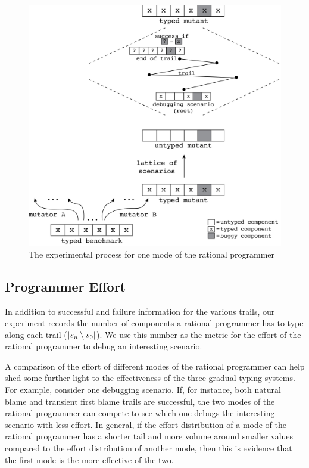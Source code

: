 \begin{figure}
  \centering
  \includegraphics[scale=0.36]{./Images/process}
  \caption{The experimental process for one mode of the rational
  programmer}
  \label{fig:process}
\end{figure}


\subsection{Programmer Effort}

In addition to successful and failure information for the various trails,  
our experiment  records the number of components a rational programmer 
has to type along each trail ($\lvert s_n \setminus s_0
\rvert$). We use this number as the metric for the effort 
of the rational programmer to debug an interesting scenario.  

A comparison of the effort of different modes of the rational programmer
can help shed some further light to the effectiveness of the
three gradual typing systems. For example, consider one debugging scenario.  
If, for instance, both  natural blame and transient first
blame trails are successful, the two modes of the 
rational programmer can compete to see which one
debugs the interesting scenario with less effort. In
general, if the effort distribution of a mode of the rational programmer
has a shorter tail and more
volume around smaller values compared to the effort distribution of another
mode, then this is evidence that the first mode is the more effective of the two.  

